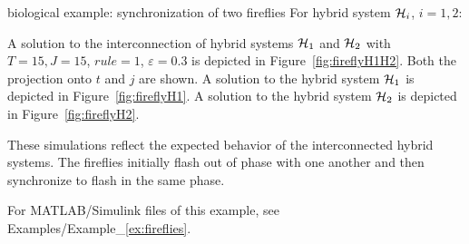 \begin{example}{biological example: synchronization of two fireflies}
For hybrid system $\mathcal{H}_i$, $i = 1,2$:

\label{scr:f}

\label{scr:C}

\label{scr:g}

\label{scr:D}

A solution to the interconnection of hybrid systems $\mathcal{H}_1$ and
$\mathcal{H}_2$ with $T=15, J=15$, $rule =1$, $\varepsilon=0.3$ is depicted in Figure~\ref{fig:fireflyH1H2}. Both the projection onto $t$ and $j$ are shown. A solution to the hybrid system $\mathcal{H}_1$ is depicted in Figure~\ref{fig:fireflyH1}. A solution to the hybrid system $\mathcal{H}_2$ is depicted in Figure~\ref{fig:fireflyH2}.

These simulations reflect the expected behavior of the interconnected hybrid systems. The fireflies initially flash out of phase with one another and then synchronize to flash in the same phase.

For MATLAB/Simulink files of this example, see Examples/Example\_\ref{ex:fireflies}.

\end{example}




